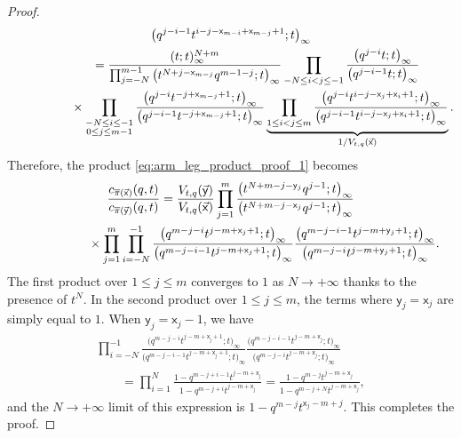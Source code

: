 \documentclass[pdftex]{sigma}
\numberwithin{equation}{section}
\begin{document}
\begin{proof}
\begin{gather*}
		{\big(q^{j-i-1}t^{i-j-\mathsf{x}_{m-i}+\mathsf{x}_{m-j}+1};t\big)_{\infty}}
		\\
\hphantom{c_{\overline\pi(\vec{\mathsf{x}})}(q,t)}{}
		=
		\frac{(t;t)_{\infty}^{N+m}}
		{
			\prod_{j=-N}^{m-1}
			\big(t^{N+j-\mathsf{x}_{m-j}}q^{m-1-j};t\big)_{\infty}
		}
		\prod_{-N\le i<j\le -1}
		\frac{\big(q^{j-i}t;t\big)_{\infty}}
		{\big(q^{j-i-1}t;t\big)_{\infty}}
		\\
\hphantom{c_{\overline\pi(\vec{\mathsf{x}})}(q,t)=}{}
\times
		\prod_{\substack{-N\le i\le -1 \\ 0\le j\le m-1}}
		\frac{\big(q^{j-i}t^{-j+\mathsf{x}_{m-j}+1};t\big)_{\infty}}
		{\big(q^{j-i-1}t^{-j+\mathsf{x}_{m-j}+1};t\big)_{\infty}}
		\underbrace{
		\prod_{1\le i<j\le m}
		\frac{\big(q^{j-i}t^{i-j-\mathsf{x}_{j}+\mathsf{x}_{i}+1};t\big)_{\infty}}
		{\big(q^{j-i-1}t^{i-j-\mathsf{x}_{j}+\mathsf{x}_{i}+1};t\big)_{\infty}}}
		_{1/V_{t,q}(\vec{\mathsf{x}})}.
	\end{gather*}
	Therefore,
	the product \eqref{eq:arm_leg_product_proof_1}
	becomes
	\begin{gather*}
		\frac{c_{\overline\pi(\vec{\mathsf{x}})}(q,t)}
		{c_{\overline\pi(\vec{\mathsf{y}})}(q,t)}
		=
		\frac{V_{t,q}(\vec{\mathsf{y}})}
		{V_{t,q}(\vec{\mathsf{x}})}
			\prod_{j=1}^{m}
		\frac{
			\big(t^{N+m-j-\mathsf{y}_{j}}q^{j-1};t\big)_{\infty}
		}
		{
			\big(t^{N+m-j-\mathsf{x}_{j}}q^{j-1};t\big)_{\infty}
		}\\
\hphantom{\frac{c_{\overline\pi(\vec{\mathsf{x}})}(q,t)}
		{c_{\overline\pi(\vec{\mathsf{y}})}(q,t)}=}{}
\times
		\prod_{j=1}^{m}
		\prod_{i=-N}^{-1}
		\frac{\big(q^{m-j-i}t^{j-m+\mathsf{x}_{j}+1};t\big)_{\infty}}
		{\big(q^{m-j-i-1}t^{j-m+\mathsf{x}_{j}+1};t\big)_{\infty}}
		\frac
		{\big(q^{m-j-i-1}t^{j-m+\mathsf{y}_{j}+1};t\big)_{\infty}}
		{\big(q^{m-j-i}t^{j-m+\mathsf{y}_{j}+1};t\big)_{\infty}}.
	\end{gather*}
	The first product over $1\le j\le m$
	converges to $1$ as $N\to+\infty$
	thanks to the presence of $t^N$.
	In the second product over $1\le j\le m$, the terms
	where $\mathsf{y}_j=\mathsf{x}_j$ are simply equal to $1$.
	When $\mathsf{y}_j=\mathsf{x}_j-1$, we have
	\begin{gather*}
		\prod_{i=-N}^{-1}
		\frac{\big(q^{m-j-i}t^{j-m+\mathsf{x}_{j}+1};t\big)_{\infty}}
		{\big(q^{m-j-i-1}t^{j-m+\mathsf{x}_{j}+1};t\big)_{\infty}}
		\frac
		{\big(q^{m-j-i-1}t^{j-m+\mathsf{x}_{j}};t\big)_{\infty}}
		{\big(q^{m-j-i}t^{j-m+\mathsf{x}_{j}};t\big)_{\infty}}
	\\
\qquad{}	 =
		\prod_{i=1}^{N}
		\frac{1-q^{m-j+i-1}t^{j-m+\mathsf{x}_{j}}}
		{1-q^{m-j+i}t^{j-m+\mathsf{x}_{j}}}
	 =
		\frac{1-q^{m-j}t^{j-m+\mathsf{x}_{j}}}
		{1-q^{m-j+N}t^{j-m+\mathsf{x}_{j}}},
	\end{gather*}
	and the $N\to+\infty$ limit of this expression is
	$1-q^{m-j}t^{\mathsf{x}_{j}-m+j}$.
	This completes the proof.
\end{proof}
\end{document}
